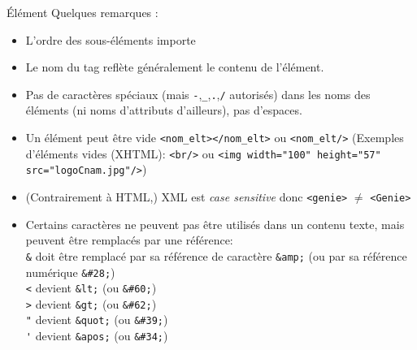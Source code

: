 \begin{frame}{\'El\'ement}
Quelques remarques : 
\begin{itemize}
\item L'ordre des sous-\'el\'ements importe  
\item Le nom du tag refl\`ete g\'en\'eralement le contenu de l'\'el\'ement.
\item Pas de caract\`eres sp\'eciaux (mais \verb?-?,\verb?_?,\verb?.?,\verb?/? autoris\'es) dans les noms des \'el\'ements (ni noms d'attributs d'ailleurs), pas d'espaces.
\item Un \'el\'ement peut \^etre vide \verb?<nom_elt></nom_elt>? ou \verb?<nom_elt/>? (Exemples d'éléments vides (XHTML): \verb?<br/>? ou \verb?<img width="100" height="57" src="logoCnam.jpg"/>?) 
\item (Contrairement à HTML,) XML est \textit{case sensitive} donc \verb?<genie>? $\neq$ \verb?<Genie>?
\item Certains caract\`eres ne peuvent pas \^etre utilis\'es dans un contenu texte, mais peuvent \^etre remplac\'es par une r\'ef\'erence:\\ 
\verb?&? doit \^etre remplac\'e par sa r\'ef\'erence de caract\`ere \verb?&amp;? (ou par sa r\'ef\'erence num\'erique \verb?&#28;?) \\
\verb?<? devient \verb?&lt;? (ou \verb?&#60;?)\\
\verb?>? devient \verb?&gt;? (ou \verb?&#62;?)\\
\verb?"? devient \verb?&quot;? (ou \verb?&#39;?)\\
\verb?'? devient \verb?&apos;? (ou \verb?&#34;?)\\
\end{itemize}

\end{frame}



